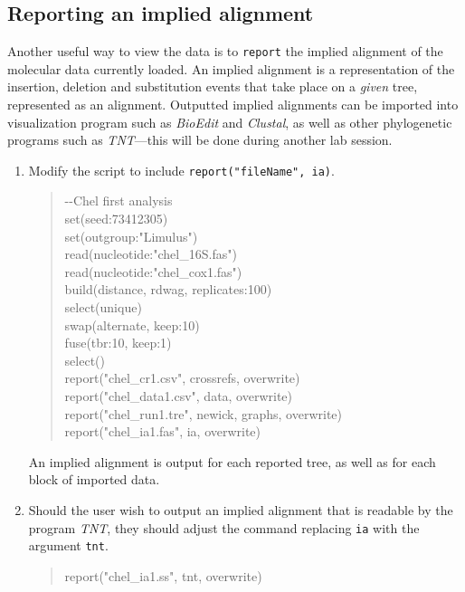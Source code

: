 \documentclass[11pt]{article}
\begin{document}
\subsection{Reporting an implied alignment}
\label{subsec:ia}

Another useful way to view the data is to \texttt{report} the implied alignment of the 
molecular data currently loaded. An implied alignment is a representation of the 
insertion, deletion and substitution events that take place on a \textit{given} tree, 
represented as an alignment. Outputted implied alignments can be imported into 
visualization program such as \textit{BioEdit} and \textit{Clustal}, as well as other 
phylogenetic programs such as \textit{TNT}---this will be done during another lab 
session. 

\begin{enumerate}

\item Modify the script to include \texttt{report("fileName", ia)}.

	\begin{quote}
	-\/-Chel first analysis\\
	set(seed:73412305)\\
	set(outgroup:"Limulus")\\
	read(nucleotide:"chel\_16S.fas")\\
	read(nucleotide:"chel\_cox1.fas")\\
	build(distance, rdwag, replicates:100)\\
	select(unique)\\
	swap(alternate, keep:10)\\
	fuse(tbr:10, keep:1)\\
	select()\\
	report("chel\_cr1.csv", crossrefs, overwrite)\\
	report("chel\_data1.csv", data, overwrite)\\
	report("chel\_run1.tre", newick, graphs, overwrite)\\
	report("chel\_ia1.fas", ia, overwrite)\\
	\end{quote}
	
An implied alignment is output for each reported tree, as well as for each block of imported data.

\item Should the user wish to output an implied alignment that is readable by the 
program \textit{TNT}, they should adjust the command  replacing \texttt{ia} with the
argument \texttt{tnt}.

	\begin{quote}
	report("chel\_ia1.ss", tnt, overwrite)\\
	\end{quote}
	
\end{enumerate}
\end{document}
